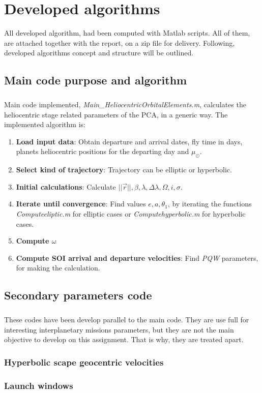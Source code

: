 \chapter{Developed algorithms}
All developed algorithm, had been computed with Matlab scripts. All of them, are attached together with the report, on a zip file for delivery. Following, developed algorithms concept and structure will be outlined.
	\section{Main code purpose and algorithm}
	\paragraph{} Main code implemented, \textit{Main\_HeliocentricOrbitalElements.m}, calculates the heliocentric stage related parameters of the PCA, in a generic way. The implemented algorithm is:
	\begin{enumerate}
		\item \textbf{Load input data}: Obtain departure and arrival dates, fly time in days, planets heliocentric positions for the departing day and $\mu_\odot$.
		\item \textbf{Select kind of trajectory}: Trajectory can be elliptic or hyperbolic.
		\item \textbf{Initial calculations}: Calculate $||\vec{r}||, \beta, \lambda, \Delta\lambda, \Omega, i, \sigma$.
		\item \textbf{Iterate until convergence}: Find values $e, a, \theta_1$, by iterating the functions \textit{Computeeliptic.m} for elliptic cases or \textit{Computehyperbolic.m} for hyperbolic cases.
		\item \textbf{Compute $\omega$}
		\item \textbf{Compute SOI arrival and departure velocities}: Find \textit{PQW} parameters, for making the calculation.
		
	\end{enumerate}

	\section{Secondary parameters code}
	\paragraph{} These codes have been develop parallel to the main code. They are use full for interesting interplanetary missions parameters, but they are not the main objective to develop on this assignment. That is why, they are treated apart.  
		\subsection{Hyperbolic scape geocentric velocities}
		
		\subsection{Launch windows}

